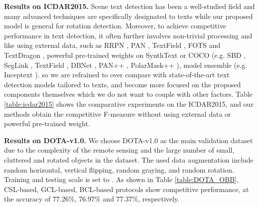 \documentclass[10pt,journal,compsoc]{IEEEtran}
\begin{document}
\noindent \textbf{Results on ICDAR2015.}
Scene text detection has been a well-studied field and many advanced techniques are specifically designated to texts while our proposed model is general for rotation detection. Moreover, to achieve competitive performance in text detection, it often further involves non-trivial processing and like using external data, such as RRPN \cite{ma2018arbitrary}, PAN \cite{wang2019efficient}, TextField \cite{xu2019textfield}, FOTS \cite{liu2018fots} and TextDragon \cite{feng2019textdragon}, powerful pre-trained weights on SynthText \cite{gupta2016synthetic} or COCO \cite{lin2014microsoft} (e.g. SBD \cite{liu2019omnidirectional}, SegLink \cite{shi2017detecting}, TextField \cite{xu2019textfield}, DBNet \cite{liao2020real}, PAN++ \cite{wang2021pan++}, PolarMask++ \cite{xie2021polarmask++}), model ensemble (e.g. Inceptext \cite{yang2018inceptext}). so we are refrained to over compare with state-of-the-art text detection models tailored to texts, and become more focused on the proposed components themselves which we do not want to couple with other factors. Table \ref{table:icdar2015} shows the comparative experiments on the ICDAR2015, and our methods obtain the competitive F-measure without using external data or powerful pre-trained weight.

\noindent \textbf{Results on DOTA-v1.0.}
We choose DOTA-v1.0 as the main validation dataset due to the complexity of the remote sensing and the large number of small, cluttered and rotated objects in the dataset. The used data augmentation include random horizontal, vertical flipping, random graying, and random rotation. Training and testing scale is set to . As shown in Table \ref{table:DOTA_OBB}, CSL-based, GCL-based, BCL-based protocols show competitive performance, at the accuracy of 77.26\%, 76.97\% and 77.37\%, respectively.
\end{document}
